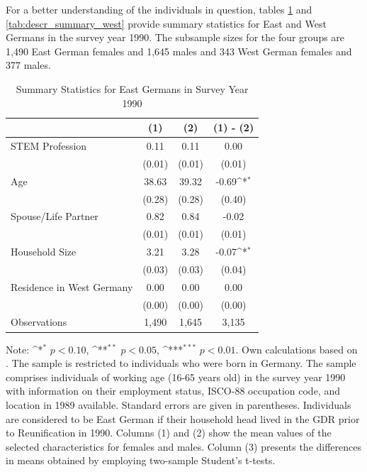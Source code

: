 \documentclass[a4paper, oneside, hyperfootnotes = false]{article}
\def\sym#1{\ifmmode^{#1}\else\(^{#1}\)\fi}
\begin{document}
{For a better understanding of the individuals in question, tables \ref{tab:descr_summary_east} and \ref{tab:descr_summary_west} provide summary statistics for East and West Germans in the survey year 1990.
The subsample sizes for the four groups are 1,490 East German females and 1,645 males and 343 West German females and 377 males.

\begin{table}[ht]
	\caption{Summary Statistics for East Germans in Survey Year 1990}
	\label{tab:descr_summary_east}
	\begin{center}
		\begin{tabular}{l*{3}{c}}
			\toprule
			& (1) & (2) & (1) - (2) \\
			\midrule
			STEM Profession & 0.11  & 0.11  &   0.00     \\
			&   (0.01)  & (0.01) & (0.01) \\
			\addlinespace
			Age         &   38.63   &  39.32  &  -0.69\sym{*}     \\
			&     (0.28) &        (0.28)         &      (0.40) \\
			\addlinespace
			Spouse/Life Partner &  0.82      &  0.84  &    -0.02    \\
			&      (0.01)&          (0.01)&         (0.01) \\
			\addlinespace
			Household Size      &  3.21   &  3.28   &   -0.07\sym{*}       \\
			&          (0.03)&       (0.03)        &      (0.04)\\
			\addlinespace
			Residence in West Germany&  0.00   &   0.00  &  0.00         \\
			&         (0.00) &       (0.00)&  (0.00)\\
			\midrule
			Observations        &  1,490    &    1,645     &      3,135             \\
			\bottomrule
		\end{tabular}
		
		\vspace{2mm}
		
		\parbox{10cm}{
			\linespread{1}\footnotesize Note: \sym{*} \(p<0.10\), \sym{**} \(p<0.05\), \sym{***} \(p<0.01\). Own calculations based on \cite{SOEP2023}. The sample is restricted to individuals who were born in Germany. The sample comprises individuals of working age (16-65 years old) in the survey year 1990 with information on their employment status, ISCO-88 occupation code, and location in 1989 available. Standard errors are given in parentheses. Individuals are considered to be East German if their household head lived in the GDR prior to Reunification in 1990. Columns (1) and (2) show the mean values of the selected characteristics for females and males. Column (3) presents the differences in means obtained by employing two-sample Student's t-tests.}
		

\end{center}
\end{table}}
\end{document}
